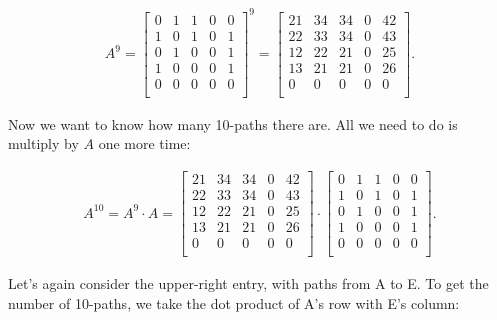 \vspace{-.15in}
\begin{align*}
A^9 = 
\begin{bmatrix}
0 & 1 & 1 & 0 & 0 \\
1 & 0 & 1 & 0 & 1 \\
0 & 1 & 0 & 0 & 1 \\
1 & 0 & 0 & 0 & 1 \\
0 & 0 & 0 & 0 & 0 \\
\end{bmatrix}^9 =
\begin{bmatrix}
 21 & 34 & 34 &  0 & 42 \\
 22 & 33 & 34 &  0 & 43 \\
 12 & 22 & 21 &  0 & 25 \\
 13 & 21 & 21 &  0 & 26 \\
 0 &  0 &  0 &  0 &  0 \\
\end{bmatrix}.
\end{align*}
\vspace{-.15in}

Now we want to know how many 10-paths there are. All we need to do is multiply
by $A$ one more time:

\vspace{-.15in}
\begin{align*}
A^{10} = 
A^9 \cdot A = 
\begin{bmatrix}
 21 & 34 & 34 &  0 & 42 \\
 22 & 33 & 34 &  0 & 43 \\
 12 & 22 & 21 &  0 & 25 \\
 13 & 21 & 21 &  0 & 26 \\
 0 &  0 &  0 &  0 &  0 \\
\end{bmatrix} \cdot
\begin{bmatrix}
0 & 1 & 1 & 0 & 0 \\
1 & 0 & 1 & 0 & 1 \\
0 & 1 & 0 & 0 & 1 \\
1 & 0 & 0 & 0 & 1 \\
0 & 0 & 0 & 0 & 0 \\
\end{bmatrix}.
\end{align*}
\vspace{-.15in}

Let's again consider the upper-right entry, with paths from A to E. To get the
number of 10-paths, we take the dot product of A's row with E's column:

